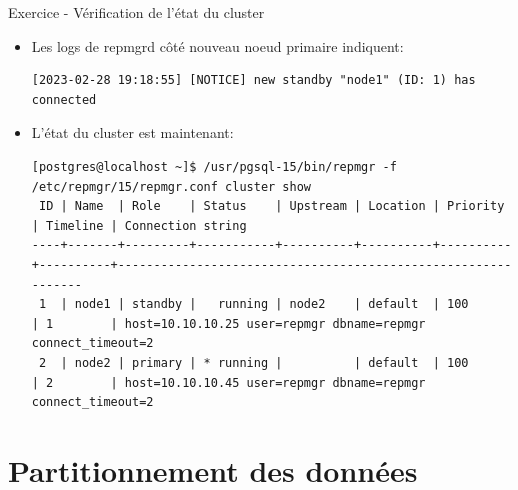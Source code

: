 \begin{frame}[fragile]{Exercice - Vérification de l'état du cluster}

   \begin{itemize}
      \item Les logs de repmgrd côté nouveau noeud primaire indiquent:
\begin{tiny}
\begin{Verbatim}[commandchars=\&\{\}]
[2023-02-28 19:18:55] [NOTICE] new standby "node1" (ID: 1) has connected
\end{Verbatim}
\end{tiny}
      \item L'état du cluster est maintenant:
\begin{tiny}
\begin{Verbatim}[commandchars=\&\{\}]
[postgres@localhost ~]$ /usr/pgsql-15/bin/repmgr -f /etc/repmgr/15/repmgr.conf cluster show
 ID | Name  | Role    | Status    | Upstream | Location | Priority | Timeline | Connection string                                           
----+-------+---------+-----------+----------+----------+----------+----------+--------------------------------------------------------------
 1  | node1 | standby |   running | node2    | default  | 100      | 1        | host=10.10.10.25 user=repmgr dbname=repmgr connect_timeout=2
 2  | node2 | primary | * running |          | default  | 100      | 2        | host=10.10.10.45 user=repmgr dbname=repmgr connect_timeout=2
\end{Verbatim}
\end{tiny}
   \end{itemize}

\end{frame}


\section{Partitionnement des données}


